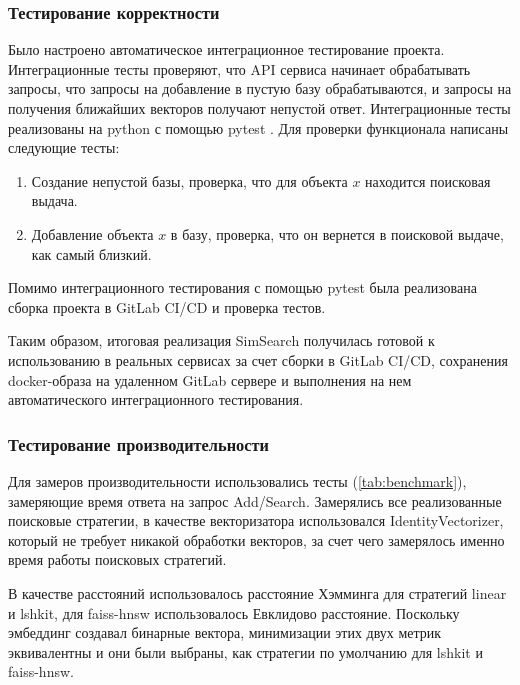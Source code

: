 \documentclass[a4paper,12pt]{extarticle}
\begin{document}
\subsubsection{Тестирование корректности}

Было настроено автоматическое интеграционное тестирование проекта. Интеграционные тесты проверяют, что API сервиса начинает обрабатывать запросы, что запросы на добавление в пустую базу обрабатываются, и запросы на получения ближайших векторов получают непустой ответ. Интеграционные тесты реализованы на python с помощью pytest \cite{pytest}.
\newpage
Для проверки функционала написаны следующие тесты:
\begin{enumerate}
\item Создание непустой базы, проверка, что для объекта $x$ находится поисковая выдача.
\item Добавление объекта $x$ в базу, проверка, что он вернется в поисковой выдаче, как самый близкий.
\end{enumerate}

Помимо интеграционного тестирования с помощью pytest была реализована сборка проекта в GitLab CI/CD \cite{gitlab} и проверка тестов.

Таким образом, итоговая реализация SimSearch получилась готовой к использованию в реальных сервисах за счет сборки в GitLab CI/CD, сохранения docker-образа на удаленном GitLab сервере и выполнения на нем автоматического интеграционного тестирования.

\subsubsection{Тестирование производительности}

Для замеров производительности использовались тесты (\cref{tab:benchmark}), замеряющие время ответа на запрос Add/Search. Замерялись все реализованные поисковые стратегии, в качестве векторизатора использовался IdentityVectorizer, который не требует никакой обработки векторов, за счет чего замерялось именно время работы поисковых стратегий.

В качестве расстояний использовалось расстояние Хэмминга для стратегий linear и lshkit, для faiss-hnsw использовалось Евклидово расстояние. Поскольку эмбеддинг создавал бинарные вектора, минимизации этих двух метрик эквивалентны и они были выбраны, как стратегии по умолчанию для lshkit и faiss-hnsw.
\end{document}
